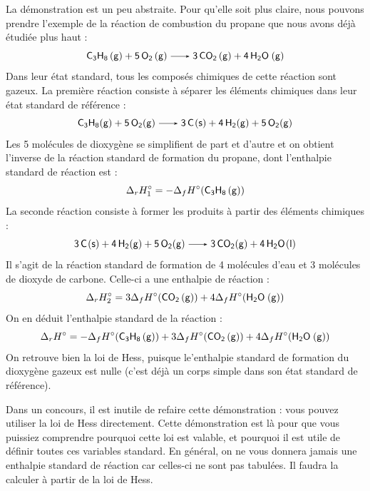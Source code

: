 \documentclass[11pt,fleqn]{book} %
\begin{document}
\begin{example}
    La démonstration est un peu abstraite. Pour qu'elle soit plus claire, nous pouvons prendre l'exemple de la réaction de combustion du propane que nous avons déjà étudiée plus haut :
    \begin{equation}
    \ce{C3H8 (g) + 5 O2 (g) -> 3 CO2 (g) + 4 H2O (g)}
\end{equation}
Dans leur état standard, tous les composés chimiques de cette réaction sont gazeux. La première réaction consiste à séparer les éléments chimiques dans leur état standard de référence :
\begin{equation}
    \ce{C3H8(g) + 5O2(g) -> 3 C(s) + 4 H2(g) + 5 O2(g) }
\end{equation}
Les 5 molécules de dioxygène se simplifient de part et d'autre et on obtient l'inverse de la réaction standard de formation du propane, dont l'enthalpie standard de réaction est :
\begin{equation}
    \Delta_r H\degree_1 = - \Delta_f H\degree(\ce{C3H8 (g)})
\end{equation}
La seconde réaction consiste à former les produits à partir des éléments chimiques :
\begin{equation}
    \ce{3 C(s) + 4 H2(g) + 5 O2(g) -> 3 CO2(g) + 4 H2O(l) }
\end{equation}
Il s'agit de la réaction standard de formation de 4 molécules d'eau et 3 molécules de dioxyde de carbone. Celle-ci a une enthalpie de réaction :
\begin{equation}
    \Delta_r H\degree_2 = 3\Delta_f H\degree(\ce{CO2 (g)}) + 4\Delta_f H\degree(\ce{H2O (g)})
\end{equation}
On en déduit l'enthalpie standard de la réaction :
\begin{equation}
    \Delta_r H\degree = - \Delta_f H\degree(\ce{C3H8 (g)}) + 3\Delta_f H\degree(\ce{CO2 (g)}) + 4\Delta_f H\degree(\ce{H2O (g)})
\end{equation}
On retrouve bien la loi de Hess, puisque le'enthalpie standard de formation du dioxygène gazeux est nulle (c'est déjà un corps simple dans son état standard de référence).
\end{example}

\begin{remark}
    Dans un concours, il est inutile de refaire cette démonstration : vous pouvez utiliser la loi de Hess directement. Cette démonstration est là pour que vous puissiez comprendre pourquoi cette loi est valable, et pourquoi il est utile de définir toutes ces variables standard. En général, on ne vous donnera jamais une enthalpie standard de réaction car celles-ci ne sont pas tabulées. Il faudra la calculer à partir de la loi de Hess.
\end{remark}
\end{document}
